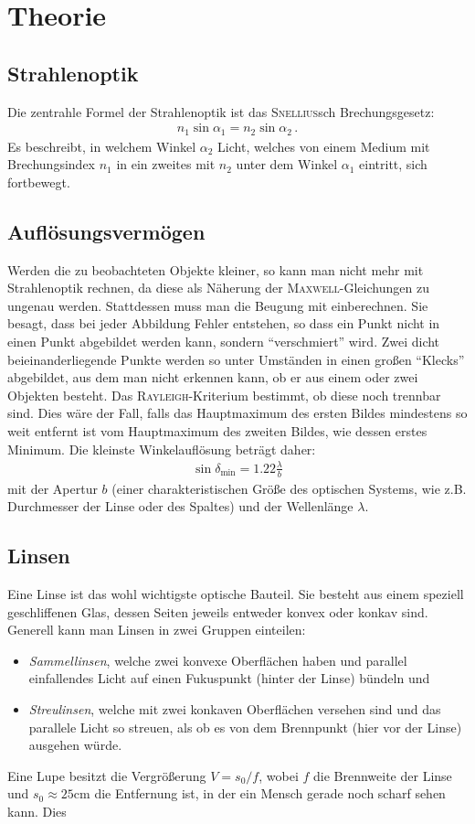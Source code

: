 \documentclass[12pt,a4paper,titlepage,headinclude,bibtotoc]{scrartcl}
\begin{document}
\cite{lp18}
\section{Theorie}
\label{sec:theorie}
\subsection{Strahlenoptik}
Die zentrahle Formel der Strahlenoptik ist das \textsc{Snellius}sch Brechungsgesetz:
\begin{align}
	n_1 \sin \alpha_1=n_2\sin\alpha_2\, .
\end{align}
Es beschreibt, in welchem Winkel $\alpha_2$ Licht, welches von einem Medium mit Brechungsindex $n_1$ in ein zweites mit $n_2$ unter dem Winkel $\alpha_1$ eintritt, sich fortbewegt.

\subsection{Auflösungsvermögen}
Werden die zu beobachteten Objekte kleiner, so kann man nicht mehr mit Strahlenoptik rechnen, da diese als Näherung der \textsc{Maxwell}-Gleichungen zu ungenau werden.
Stattdessen muss man die Beugung mit einberechnen.
Sie besagt, dass bei jeder Abbildung Fehler entstehen, so dass ein Punkt nicht in einen Punkt abgebildet werden kann, sondern "`verschmiert"' wird.
Zwei dicht beieinanderliegende Punkte werden so unter Umständen in einen großen "`Klecks"' abgebildet, aus dem man nicht erkennen kann, ob er aus einem oder zwei Objekten besteht.
Das \textsc{Rayleigh}-Kriterium bestimmt, ob diese noch trennbar sind.
Dies wäre der Fall, falls das Hauptmaximum des ersten Bildes mindestens so weit entfernt ist vom Hauptmaximum des zweiten Bildes, wie dessen erstes Minimum.
Die kleinste Winkelauflösung beträgt daher:
\begin{align}
	\sin\delta_\text{min}=1.22\frac{\lambda}{b}
\end{align}
mit der Apertur $b$ (einer charakteristischen Größe des optischen Systems, wie z.B. Durchmesser der Linse oder des Spaltes) und der Wellenlänge $\lambda$.

\subsection{Linsen}
Eine Linse ist das wohl wichtigste optische Bauteil.
Sie besteht aus einem speziell geschliffenen Glas, dessen Seiten jeweils entweder konvex oder konkav sind.
Generell kann man Linsen in zwei Gruppen einteilen:
\begin{itemize}
\item \emph{Sammellinsen}, welche zwei konvexe Oberflächen haben und parallel einfallendes Licht auf einen Fukuspunkt (hinter der Linse) bündeln und
\item \emph{Streulinsen}, welche mit zwei konkaven Oberflächen versehen sind und das parallele Licht so streuen, als ob es von dem Brennpunkt (hier vor der Linse) ausgehen würde.
\end{itemize}
Eine Lupe besitzt die Vergrößerung $V=s_0/f$, wobei $f$ die Brennweite der Linse und $s_0\approx 25\si{\centi\meter}$ die Entfernung ist, in der ein Mensch gerade noch scharf sehen kann.
Dies 
\end{document}
